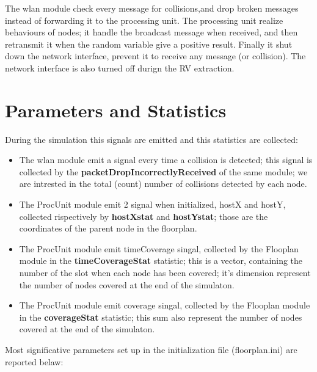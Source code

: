 The wlan module check every message for collisions,and drop broken messages instead of forwarding it to the processing unit. 
The processing unit realize behaviours of nodes; it handle the broadcast message when received, and then retransmit it when 
the random variable give a positive result. Finally it shut down the network interface, prevent it to receive any message (or collision).
The network interface is also turned off durign the RV extraction. \\
\section{Parameters and Statistics}
During the simulation this signals are emitted and this statistics are collected:
\begin{itemize}
    \item The wlan module emit a signal every time a collision is detected; this signal is collected by the \textbf{packetDropIncorrectlyReceived}
        of the same module; we are intrested in the total (count) number of collisions detected by each node.
    \item The ProcUnit module emit 2 signal when initialized, hostX and hostY, collected rispectively by \textbf{hostXstat}
         and \textbf{hostYstat}; those are the coordinates of the parent node in the floorplan.
    \item The ProcUnit module emit timeCoverage singal, collected by the Flooplan module in the \textbf{timeCoverageStat} statistic;
        this is a vector, containing the number of the slot when each node has been covered; it's dimension represent the number of 
        nodes covered at the end of the simulaton.
    \item The ProcUnit module emit coverage singal, collected by the Flooplan module in the \textbf{coverageStat} statistic; 
        this sum also represent the number of nodes covered at the end of the simulaton.
\end{itemize}
Most significative parameters set up in the initialization file (floorplan.ini) are reported belaw:
